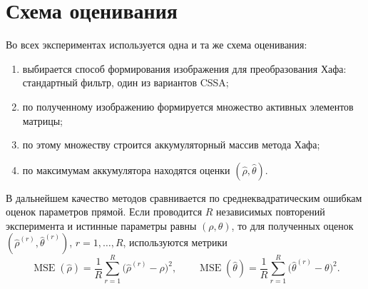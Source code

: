 \section{Схема оценивания}

Во всех экспериментах используется одна и та же схема оценивания:
\begin{enumerate}
	\item выбирается способ формирования изображения для преобразования Хафа: стандартный фильтр, один из вариантов CSSA;
	\item по полученному изображению формируется множество активных элементов матрицы;
	\item по этому множеству строится аккумуляторный массив метода Хафа;
	\item по максимумам аккумулятора находятся оценки $(\hat{\rho},\hat{\theta})$.
\end{enumerate}

В дальнейшем качество методов сравнивается по среднеквадратическим ошибкам
оценок параметров прямой. Если проводится $R$ независимых повторений
эксперимента и истинные параметры равны $(\rho,\theta)$, то для полученных
оценок $(\widehat{\rho}^{(r)},\widehat{\theta}^{(r)})$, $r=1,\dots,R$,
используются метрики
\[
\operatorname{MSE}(\widehat{\rho})
=
\frac{1}{R}\sum_{r=1}^{R}
\bigl(\widehat{\rho}^{(r)}-\rho\bigr)^2,
\qquad
\operatorname{MSE}(\widehat{\theta})
=
\frac{1}{R}\sum_{r=1}^{R}
\bigl(\widehat{\theta}^{(r)}-\theta\bigr)^2.
\]

